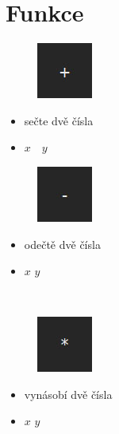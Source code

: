 \documentclass[a4paper, 12pt]{article}
\begin{document}
\section{Funkce}
\begin{minipage}{0.07\textwidth}
\begin{figure}[H]
\includegraphics[scale=0.7]{plus.jpg}
\end{figure}
\end{minipage}
\begin{minipage}{0.45\textwidth}
\begin{itemize}
\item sečte dvě čísla
\item $x$\ \keys{{+}}\ $y$ \keys{=}
\end{itemize}
\end{minipage} %
\begin{minipage}{0.07\textwidth}
\begin{figure}[H]
\includegraphics[scale=0.7]{minus.jpg}
\end{figure}
\end{minipage}
\begin{minipage}{0.45\textwidth}
\begin{itemize}
\item odečtě dvě čísla
\item $x$ \keys{{-}} $y$ \keys{=}
\end{itemize}
\end{minipage}
\\%
\begin{minipage}{0.07\textwidth}
\begin{figure}[H]
\includegraphics[scale=0.7]{mul.jpg}
\end{figure}
\end{minipage}
\begin{minipage}{0.45\textwidth}
\begin{itemize}
\item vynásobí dvě čísla
\item $x$ \keys{*} $y$ \keys{=}
\end{itemize}
\end{minipage} %
\end{document}
